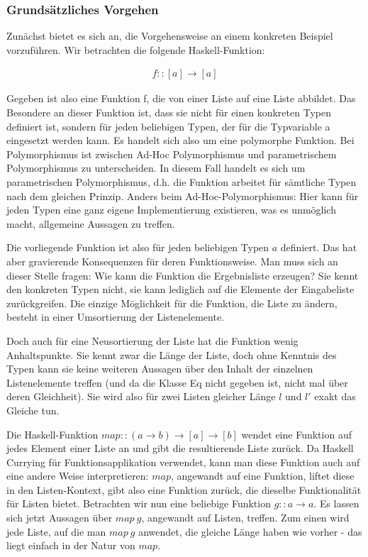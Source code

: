 \documentclass[11pt]{article} %
\begin{document}
\subsubsection{Grundsätzliches Vorgehen}

Zunächst bietet es sich an, die Vorgehensweise an einem konkreten Beispiel vorzuführen. Wir betrachten die folgende Haskell-Funktion:

\begin{align}
f :: [a] \rightarrow [a]
\end{align}

Gegeben ist also eine Funktion f, die von einer Liste auf eine Liste abbildet. Das Besondere an dieser Funktion ist, dass sie
nicht für einen konkreten Typen definiert ist, sondern für jeden beliebigen Typen, der für die Typvariable a eingesetzt werden
kann. Es handelt sich also um eine polymorphe Funktion.
Bei Polymorphismus ist zwischen Ad-Hoc Polymorphismus und parametrischem Polymorphismus zu unterscheiden. In diesem Fall handelt es sich um parametrischen Polymorphismus, d.h. die Funktion arbeitet für sämtliche Typen nach dem gleichen Prinzip.
Anders beim Ad-Hoc-Polymorphismus: Hier kann für jeden Typen eine ganz eigene Implementierung existieren, was es unmöglich macht, allgemeine Aussagen zu treffen.

Die vorliegende Funktion ist also für jeden beliebigen Typen $a$ definiert. Das hat aber gravierende Konsequenzen für
deren Funktionsweise. Man muss sich an dieser Stelle fragen: Wie kann die Funktion die Ergebnisliste erzeugen? Sie kennt den konkreten Typen nicht, sie kann lediglich auf die Elemente der Eingabeliste zurückgreifen. Die einzige Möglichkeit für die Funktion,
die Liste zu ändern, besteht in einer Umsortierung der Listenelemente.

Doch auch für eine Neusortierung der Liste hat die Funktion wenig Anhaltspunkte. Sie kennt zwar die Länge der Liste, doch ohne Kenntnis des Typen kann sie keine weiteren Aussagen über den Inhalt der einzelnen Listenelemente treffen (und da die Klasse Eq nicht
gegeben ist, nicht mal über deren Gleichheit). Sie wird also für zwei Listen gleicher Länge $l$ und $l'$ exakt das Gleiche tun.

Die Haskell-Funktion \texttt{$map :: (a \rightarrow b) \rightarrow [a] \rightarrow [b]$} wendet eine Funktion auf jedes Element einer Liste an und gibt die resultierende Liste zurück. Da Haskell Currying für Funktionsapplikation verwendet, kann man
diese Funktion auch auf eine andere Weise interpretieren: $map$, angewandt auf eine Funktion, liftet diese in den Listen-Kontext,
gibt also eine Funktion zurück, die dieselbe Funktionalität für Listen bietet. Betrachten wir nun eine beliebige Funktion $g :: a \rightarrow a$. Es lassen sich jetzt Aussagen über $map\ g$, angewandt auf Listen, treffen. Zum einen wird jede Liste, auf die man $map\ g$ anwendet, die gleiche Länge haben wie vorher - das liegt einfach in der Natur von $map$.
\end{document}
